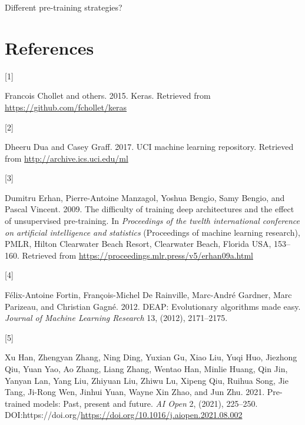 \documentclass[
  11pt,
]{article}
\newlength{\cslhangindent}
\newlength{\csllabelwidth}
\newlength{\cslentryspacingunit} %
\newenvironment{CSLReferences}[2] %
 {%
  \setlength{\parindent}{0pt}
  \ifodd #1
  \let\oldpar\par
  \def\par{\hangindent=\cslhangindent\oldpar}
  \fi
  \setlength{\parskip}{#2\cslentryspacingunit}
 }%
 {}
\newcommand{\CSLLeftMargin}[1]{\parbox[t]{\csllabelwidth}{#1}}
\newcommand{\CSLRightInline}[1]{\parbox[t]{\linewidth - \csllabelwidth}{#1}\break}
\begin{document}
Different pre-training strategies?

\newpage

\hypertarget{I}{%
\section*{References}\label{I}}

\hypertarget{refs}{}
\begin{CSLReferences}{0}{0}
\leavevmode{}%
\CSLLeftMargin{{[}1{]} }%
\CSLRightInline{Francois Chollet and others. 2015. Keras. Retrieved from
\url{https://github.com/fchollet/keras}}

\leavevmode{}%
\CSLLeftMargin{{[}2{]} }%
\CSLRightInline{Dheeru Dua and Casey Graff. 2017. {UCI} machine learning
repository. Retrieved from \url{http://archive.ics.uci.edu/ml}}

\leavevmode{}%
\CSLLeftMargin{{[}3{]} }%
\CSLRightInline{Dumitru Erhan, Pierre-Antoine Manzagol, Yoshua Bengio,
Samy Bengio, and Pascal Vincent. 2009. The difficulty of training deep
architectures and the effect of unsupervised pre-training. In
\emph{Proceedings of the twelth international conference on artificial
intelligence and statistics} (Proceedings of machine learning research),
PMLR, Hilton Clearwater Beach Resort, Clearwater Beach, Florida USA,
153--160. Retrieved from
\url{https://proceedings.mlr.press/v5/erhan09a.html}}

\leavevmode{}%
\CSLLeftMargin{{[}4{]} }%
\CSLRightInline{Félix-Antoine Fortin, François-Michel De Rainville,
Marc-André Gardner, Marc Parizeau, and Christian Gagné. 2012. {DEAP}:
Evolutionary algorithms made easy. \emph{Journal of Machine Learning
Research} 13, (2012), 2171--2175.}

\leavevmode{}%
\CSLLeftMargin{{[}5{]} }%
\CSLRightInline{Xu Han, Zhengyan Zhang, Ning Ding, Yuxian Gu, Xiao Liu,
Yuqi Huo, Jiezhong Qiu, Yuan Yao, Ao Zhang, Liang Zhang, Wentao Han,
Minlie Huang, Qin Jin, Yanyan Lan, Yang Liu, Zhiyuan Liu, Zhiwu Lu,
Xipeng Qiu, Ruihua Song, Jie Tang, Ji-Rong Wen, Jinhui Yuan, Wayne Xin
Zhao, and Jun Zhu. 2021. Pre-trained models: Past, present and future.
\emph{AI Open} 2, (2021), 225--250.
DOI:https://doi.org/\url{https://doi.org/10.1016/j.aiopen.2021.08.002}}


\end{CSLReferences}
\end{document}
